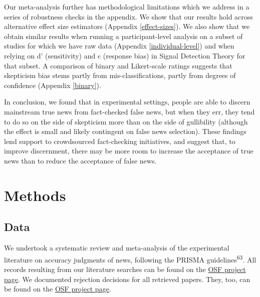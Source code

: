 \documentclass[
  doc,floatsintext]{apa6}
\begin{document}
Our meta-analysis further has methodological limitations which we address in a series of robustness checks in the appendix. We show that our results hold across alternative effect size estimators (Appendix \ref{effect-sizes}). We also show that we obtain similar results when running a participant-level analysis on a subset of studies for which we have raw data (Appendix \ref{individual-level}) and when relying on d' (sensitivity) and c (response bias) in Signal Detection Theory for that subset. A comparison of binary and Likert-scale ratings suggests that skepticism bias stems partly from mis-classifications, partly from degrees of confidence (Appendix \ref{binary}).

In conclusion, we found that in experimental settings, people are able to discern mainstream true news from fact-checked false news, but when they err, they tend to do so on the side of skepticism more than on the side of gullibility (although the effect is small and likely contingent on false news selection). These findings lend support to crowdsourced fact-checking initiatives, and suggest that, to improve discernment, there may be more room to increase the acceptance of true news than to reduce the acceptance of false news.

\section{Methods}\label{methods}

\subsection{Data}\label{data}

We undertook a systematic review and meta-analysis of the experimental literature on accuracy judgments of news, following the PRISMA guidelines\textsuperscript{63}. All records resulting from our literature searches can be found on the \href{https://osf.io/96zbp/?view_only=d2f3147f652e44e2a0414d7d6d9a6c29}{OSF project page}. We documented rejection decisions for all retrieved papers. They, too, can be found on the \href{https://osf.io/96zbp/?view_only=d2f3147f652e44e2a0414d7d6d9a6c29}{OSF project page}.
\end{document}
